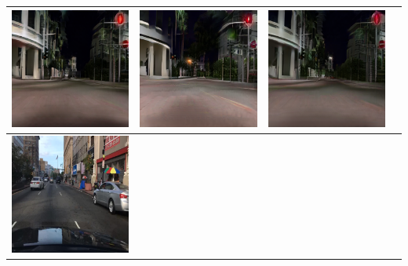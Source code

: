 \documentclass{VUMIFPSbakalaurinis}
\begin{document}
\begin{table}[H]
{\begin{tabular}{|c|c|c|c|}
            \includegraphics[scale=0.35]{img/pvz/5_cycle_v2} & \includegraphics[scale=0.35]{img/pvz/5_cut_v2} & \includegraphics[scale=0.35]{img/pvz/5_mspc_v2}
            \\
            \hline
            \includegraphics[scale=0.35]{img/pvz/6_real} & 

\end{tabular}}
\end{table}
\end{document}
